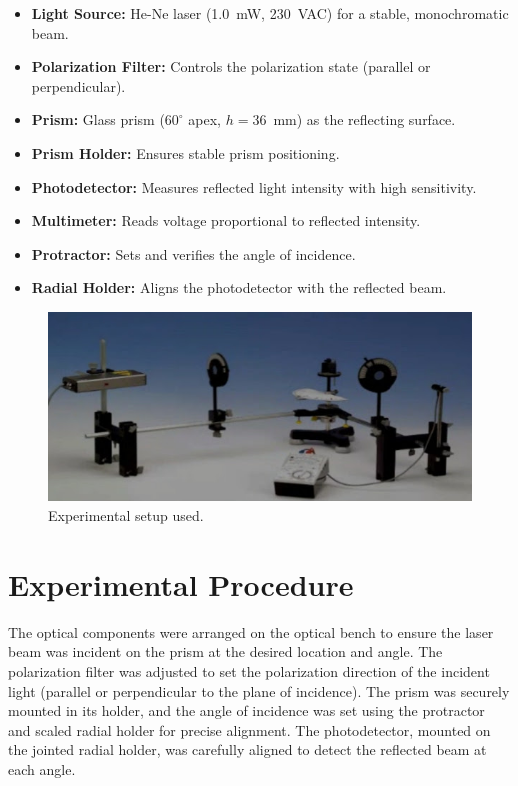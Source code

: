 \documentclass[journal]{IEEEtran}
\begin{document}
\begin{itemize}
    \item \textbf{Light Source:} He-Ne laser (1.0~mW, 230~VAC) for a stable, monochromatic beam.
    \item \textbf{Polarization Filter:} Controls the polarization state (parallel or perpendicular).
    \item \textbf{Prism:} Glass prism ($60^\circ$ apex, $h = 36$~mm) as the reflecting surface.
    \item \textbf{Prism Holder:} Ensures stable prism positioning.
    \item \textbf{Photodetector:} Measures reflected light intensity with high sensitivity.
    \item \textbf{Multimeter:} Reads voltage proportional to reflected intensity.
    \item \textbf{Protractor:} Sets and verifies the angle of incidence.
    \item \textbf{Radial Holder:} Aligns the photodetector with the reflected beam.
\end{itemize}
\begin{figure}[H]
    \centering
    \includegraphics[width=\linewidth]{../IMAGES/Experimental_Setup.png}
    \caption{Experimental setup used.}
    \label{fig:experimental_setup}
\end{figure}
\section{Experimental Procedure}
The optical components were arranged on the optical bench to ensure the laser beam was incident on the prism at the desired location and angle. The polarization filter was adjusted to set the polarization direction of the incident light (parallel or perpendicular to the plane of incidence). The prism was securely mounted in its holder, and the angle of incidence was set using the protractor and scaled radial holder for precise alignment. The photodetector, mounted on the jointed radial holder, was carefully aligned to detect the reflected beam at each angle.
\end{document}
